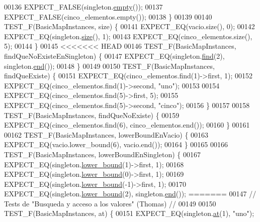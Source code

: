 \begin{DoxyCode}
00136     EXPECT\_FALSE(singleton.\hyperlink{classaed2_1_1map_a0dcb39283f4877ae59cb756ed1d0c048_a0dcb39283f4877ae59cb756ed1d0c048}{empty}());
00137     EXPECT\_FALSE(cinco\_elementos.empty());
00138 \}
00139 
00140 TEST\_F(BasicMapInstances, size) \{
00141     EXPECT\_EQ(vacio.size(), 0);
00142     EXPECT\_EQ(singleton.\hyperlink{classaed2_1_1map_aa6e806b3be6dc0da79adbfae08b571bf_aa6e806b3be6dc0da79adbfae08b571bf}{size}(), 1);
00143     EXPECT\_EQ(cinco\_elementos.size(), 5);
00144 \}
00145 
<<<<<<< HEAD
00146 TEST\_F(BasicMapInstances, findQueNoExisteEnSingleton) \{
00147     EXPECT\_EQ(singleton.\hyperlink{classaed2_1_1map_afd0fc1a8234888e61e0e615de7e245b8_afd0fc1a8234888e61e0e615de7e245b8}{find}(2), singleton.\hyperlink{classaed2_1_1map_a76023e6a56cb625513e1b5ea028bf983_a76023e6a56cb625513e1b5ea028bf983}{end}());
00148 \}
00149 
00150 TEST\_F(BasicMapInstances, findQueExiste) \{
00151     EXPECT\_EQ(cinco\_elementos.find(1)->first, 1);
00152     EXPECT\_EQ(cinco\_elementos.find(1)->second, \textcolor{stringliteral}{"uno"});
00153 
00154     EXPECT\_EQ(cinco\_elementos.find(5)->first, 5);
00155     EXPECT\_EQ(cinco\_elementos.find(5)->second, \textcolor{stringliteral}{"cinco"});
00156 \}
00157 
00158 TEST\_F(BasicMapInstances, findQueNoExiste) \{
00159     EXPECT\_EQ(cinco\_elementos.find(6), cinco\_elementos.end());
00160 \}
00161 
00162 TEST\_F(BasicMapInstances, lowerBoundEnVacio) \{
00163     EXPECT\_EQ(vacio.lower\_bound(6), vacio.end());
00164 \}
00165 
00166 TEST\_F(BasicMapInstances, lowerBoundEnSingleton) \{
00167     EXPECT\_EQ(singleton.\hyperlink{classaed2_1_1map_a3399d36fdd5a880b494f3a5795d3f18f_a3399d36fdd5a880b494f3a5795d3f18f}{lower_bound}(1)->first, 1);
00168     EXPECT\_EQ(singleton.\hyperlink{classaed2_1_1map_a3399d36fdd5a880b494f3a5795d3f18f_a3399d36fdd5a880b494f3a5795d3f18f}{lower_bound}(0)->first, 1);
00169     EXPECT\_EQ(singleton.\hyperlink{classaed2_1_1map_a3399d36fdd5a880b494f3a5795d3f18f_a3399d36fdd5a880b494f3a5795d3f18f}{lower_bound}(-1)->first, 1);
00170     EXPECT\_EQ(singleton.\hyperlink{classaed2_1_1map_a3399d36fdd5a880b494f3a5795d3f18f_a3399d36fdd5a880b494f3a5795d3f18f}{lower_bound}(2), singleton.\hyperlink{classaed2_1_1map_a76023e6a56cb625513e1b5ea028bf983_a76023e6a56cb625513e1b5ea028bf983}{end}());
=======
00147 \textcolor{comment}{// Tests de "Busqueda y acceso a los valores" (Thomas) //}
00149 \textcolor{comment}{}
00150 TEST\_F(BasicMapInstances, at) \{
00151     EXPECT\_EQ(singleton.\hyperlink{classaed2_1_1map_a579c9179b42175c23a1013ac7f1b876c_a579c9179b42175c23a1013ac7f1b876c}{at}(1), \textcolor{stringliteral}{"uno"});

\end{DoxyCode}
